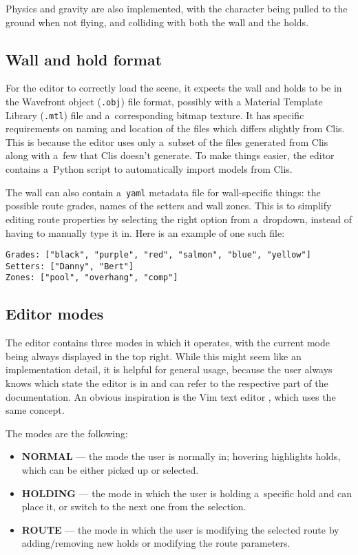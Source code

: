 Physics and gravity are also implemented, with the character being pulled to the ground when not flying, and colliding with both the wall and the holds.

\subsection{Wall and hold format}
For the editor to correctly load the scene, it expects the wall and holds to be in the Wavefront object (\verb|.obj|) file format, possibly with a Material Template Library (\verb|.mtl|) file and a~corresponding bitmap texture.
It has specific requirements on naming and location of the files which differs slightly from Clis.
This is because the editor uses only a~subset of the files generated from Clis along with a~few that Clis doesn't generate.
To make things easier, the editor contains a~Python script to automatically import models from Clis.

The wall can also contain a~\verb|yaml| metadata file for wall-specific things: the possible route grades, names of the setters and wall zones.
This is to simplify editing route properties by selecting the right option from a~dropdown, instead of having to manually type it in.
Here is an example of one such file:

\begin{verbatim}
Grades: ["black", "purple", "red", "salmon", "blue", "yellow"]
Setters: ["Danny", "Bert"]
Zones: ["pool", "overhang", "comp"]
\end{verbatim}

\subsection{Editor modes}
The editor contains three modes in which it operates, with the current mode being always displayed in the top right.
While this might seem like an implementation detail, it is helpful for general usage, because the user always knows which state the editor is in and can refer to the respective part of the documentation.
An obvious inspiration is the Vim text editor \cite{vim}, which uses the same concept.

The modes are the following:

\begin{itemize}
	\item \textbf{NORMAL} --- the mode the user is normally in; hovering highlights holds, which can be either picked up or selected.
	\item \textbf{HOLDING} --- the mode in which the user is holding a~specific hold and can place it, or switch to the next one from the selection.
	\item \textbf{ROUTE} --- the mode in which the user is modifying the selected route by adding/removing new holds or modifying the route parameters.
\end{itemize}

